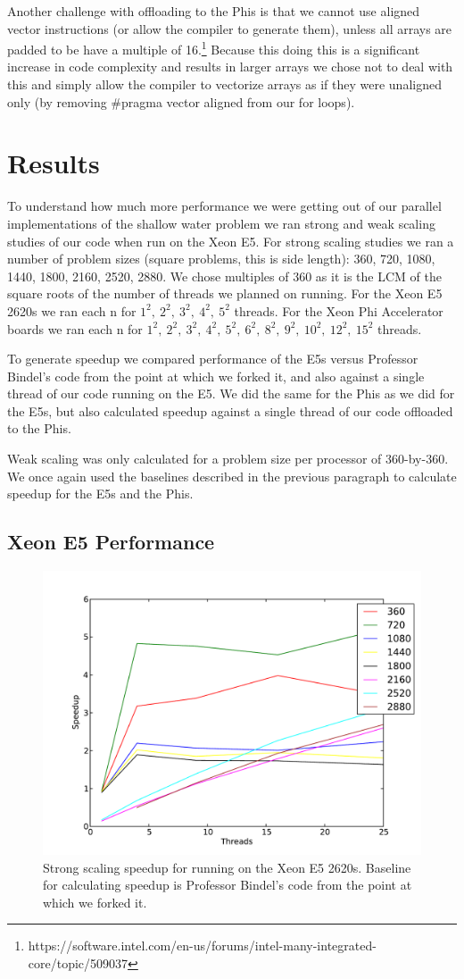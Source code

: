 \documentclass[11pt]{article}
\begin{document}
Another challenge with offloading to the Phis is that we cannot use aligned vector instructions (or allow the compiler to generate them), unless all arrays are padded to be have a multiple of 16.\footnote{https://software.intel.com/en-us/forums/intel-many-integrated-core/topic/509037} Because this doing this is a significant increase in code complexity and results in larger arrays we chose not to deal with this and simply allow the compiler to vectorize arrays as if they were unaligned only (by removing \#pragma vector aligned from our for loops).

\section{Results}

To understand how much more performance we were getting out of our parallel implementations of the shallow water problem we ran strong and weak scaling studies of our code when run on the Xeon E5. For strong scaling studies we ran a number of problem sizes (square problems, this is side length): 360, 720, 1080, 1440, 1800, 2160, 2520, 2880. We chose multiples of 360 as it is the LCM of the square roots of the number of threads we planned on running. For the Xeon E5 2620s we ran each n for $1^2,~2^2,~3^2,~4^2,~5^2$ threads. For the Xeon Phi Accelerator boards we ran each n for $1^2,~2^2,~3^2,~4^2,~5^2,~6^2,~8^2,~9^2,~10^2,~12^2,~15^2$ threads.

To generate speedup we compared performance of the E5s versus Professor Bindel's code from the point at which we forked it, and also against a single thread of our code running on the E5. We did the same for the Phis as we did for the E5s, but also calculated speedup against a single thread of our code offloaded to the Phis.

Weak scaling was only calculated for a problem size per processor of 360-by-360. We once again used the baselines described in the previous paragraph to calculate speedup for the E5s and the Phis.

\subsection{Xeon E5 Performance}

\begin{figure}[h!]
\includegraphics[width=0.5\linewidth]{e5_strong_bindel_baseline.pdf}
\caption{Strong scaling speedup for running on the Xeon E5 2620s. Baseline for calculating speedup is Professor Bindel's code from the point at which we forked it.}
\end{figure}
\end{document}
